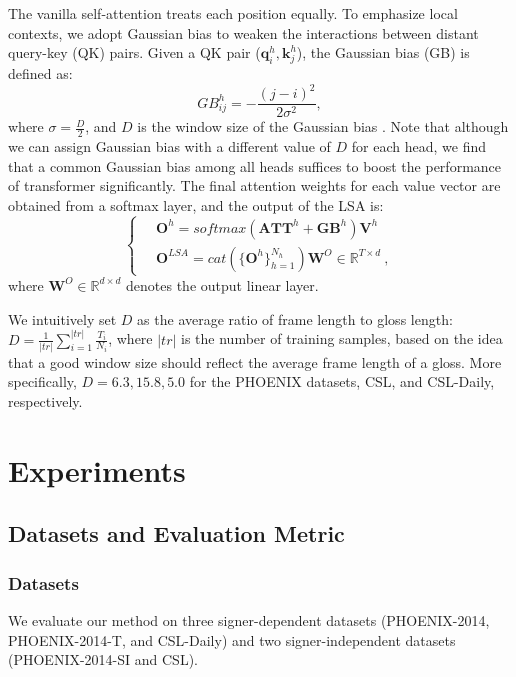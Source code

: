 \documentclass[acmsmall,screen]{acmart}
\def \mbf{\mathbf}
\begin{document}
The vanilla self-attention treats each position equally. 
To emphasize local contexts, we adopt Gaussian bias \cite{gau-1, gau-2} to weaken the interactions between distant query-key (QK) pairs.
Given a QK pair ($\mathbf{q}_i^h, \mathbf{k}_j^h$), the Gaussian bias (GB) is defined as:
\begin{equation}
    GB_{ij}^h = -\frac{(j-i)^2}{2\sigma^2},
    \label{bias}
\end{equation}
where $\sigma=\frac{D}{2}$, and $D$ is the window size of the Gaussian bias \cite{gau-1}.
Note that although we can assign Gaussian bias with a different value of $D$ for each head, we find that a common Gaussian bias among all heads suffices to boost the performance of transformer significantly.
The final attention weights for each value vector are obtained from a softmax layer, and the output of the LSA is:
\begin{equation}
\begin{cases}
    \quad \mbf{O}^h = softmax(\mbf{ATT}^h+\mbf{GB}^h)\mbf{V}^h \\
    \quad \mbf{O}^{LSA} = cat(\{\mbf{O}^h\}_{h=1}^{N_h})\mbf{W}^O \in \mathbb{R}^{T\times d} \ ,
\end{cases}
\end{equation}
where $\mbf{W}^O \in \mathbb{R}^{d\times d}$ denotes the output linear layer.

We intuitively set $D$ as the average ratio of frame length to gloss length: $D=\frac{1}{|tr|}\sum_{i=1}^{|tr|}\frac{T_i}{N_i}$,
where $|tr|$ is the number of training samples, based on the idea that a good window size should reflect the average frame length of a gloss.
More specifically, $D=6.3,15.8,5.0$ for the PHOENIX datasets, CSL, and CSL-Daily, respectively.
 \section{Experiments}


\subsection{Datasets and Evaluation Metric}
\subsubsection{Datasets}
We evaluate our method on three signer-dependent datasets (PHOENIX-2014, PHOENIX-2014-T, and CSL-Daily) and two signer-independent datasets (PHOENIX-2014-SI and CSL).
\end{document}

